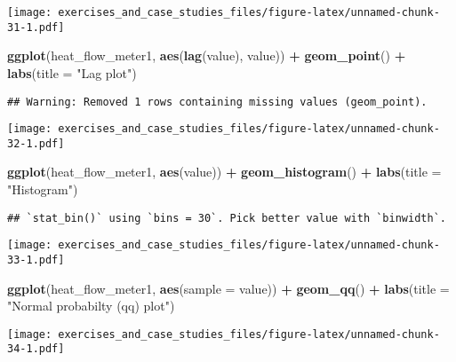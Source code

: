 \documentclass[]{book}
\newenvironment{Shaded}{\begin{snugshade}}{\end{snugshade}}
\newcommand{\DataTypeTok}[1]{\textcolor[rgb]{0.13,0.29,0.53}{#1}}
\newcommand{\KeywordTok}[1]{\textcolor[rgb]{0.13,0.29,0.53}{\textbf{#1}}}
\newcommand{\NormalTok}[1]{#1}
\newcommand{\OperatorTok}[1]{\textcolor[rgb]{0.81,0.36,0.00}{\textbf{#1}}}
\newcommand{\StringTok}[1]{\textcolor[rgb]{0.31,0.60,0.02}{#1}}
\theoremstyle{definition}
\theoremstyle{definition}
\theoremstyle{definition}
\theoremstyle{remark}
\begin{document}
\texttt{[image: exercises\_and\_case\_studies\_files/figure-latex/unnamed-chunk-31-1.pdf]}

\begin{Shaded}
\begin{Highlighting}[]
\KeywordTok{ggplot}\NormalTok{(heat_flow_meter1, }\KeywordTok{aes}\NormalTok{(}\KeywordTok{lag}\NormalTok{(value), value)) }\OperatorTok{+}
\StringTok{  }\KeywordTok{geom_point}\NormalTok{() }\OperatorTok{+}
\StringTok{  }\KeywordTok{labs}\NormalTok{(}\DataTypeTok{title =} \StringTok{"Lag plot"}\NormalTok{)}
\end{Highlighting}
\end{Shaded}

\begin{verbatim}
## Warning: Removed 1 rows containing missing values (geom_point).
\end{verbatim}

\texttt{[image: exercises\_and\_case\_studies\_files/figure-latex/unnamed-chunk-32-1.pdf]}

\begin{Shaded}
\begin{Highlighting}[]
\KeywordTok{ggplot}\NormalTok{(heat_flow_meter1, }\KeywordTok{aes}\NormalTok{(value)) }\OperatorTok{+}
\StringTok{  }\KeywordTok{geom_histogram}\NormalTok{() }\OperatorTok{+}
\StringTok{  }\KeywordTok{labs}\NormalTok{(}\DataTypeTok{title =} \StringTok{"Histogram"}\NormalTok{)}
\end{Highlighting}
\end{Shaded}

\begin{verbatim}
## `stat_bin()` using `bins = 30`. Pick better value with `binwidth`.
\end{verbatim}

\texttt{[image: exercises\_and\_case\_studies\_files/figure-latex/unnamed-chunk-33-1.pdf]}

\begin{Shaded}
\begin{Highlighting}[]
\KeywordTok{ggplot}\NormalTok{(heat_flow_meter1, }\KeywordTok{aes}\NormalTok{(}\DataTypeTok{sample =}\NormalTok{ value)) }\OperatorTok{+}
\StringTok{  }\KeywordTok{geom_qq}\NormalTok{() }\OperatorTok{+}
\StringTok{  }\KeywordTok{labs}\NormalTok{(}\DataTypeTok{title =} \StringTok{"Normal probabilty (qq) plot"}\NormalTok{)}
\end{Highlighting}
\end{Shaded}

\texttt{[image: exercises\_and\_case\_studies\_files/figure-latex/unnamed-chunk-34-1.pdf]}
\end{document}
